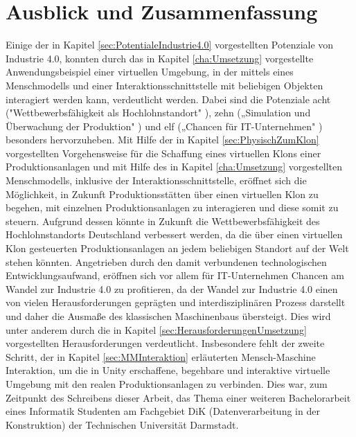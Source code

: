 \chapter{Ausblick und Zusammenfassung}\label{cha:AusblickUndFazit}

Einige der in Kapitel \ref{sec:PotentialeIndustrie4.0} vorgestellten Potenziale von Industrie 4.0, konnten durch das in Kapitel \ref{cha:Umsetzung} vorgestellte Anwendungsbeispiel einer virtuellen Umgebung, in der mittels eines Menschmodells und einer Interaktionsschnittstelle mit beliebigen Objekten interagiert werden kann, verdeutlicht werden. Dabei sind die Potenziale acht ("Wettbewerbsfähigkeit als Hochlohnstandort" \cite[S.20]{12}), zehn („Simulation und Überwachung der Produktion" \cite{6}) und elf („Chancen für IT-Unternehmen" \cite[S.7]{2}) besonders hervorzuheben.
\newline
Mit Hilfe der in Kapitel \ref{sec:PhysischZumKlon} vorgestellten Vorgehensweise für die Schaffung eines virtuellen Klons einer Produktionsanlagen und mit Hilfe des in Kapitel \ref{cha:Umsetzung} vorgestellten Menschmodells, inklusive der Interaktionsschnittstelle, eröffnet sich die Möglichkeit, in Zukunft Produktionsstätten über einen virtuellen Klon zu begehen, mit einzelnen Produktionsanlagen zu interagieren und diese somit zu steuern. Aufgrund dessen könnte in Zukunft die Wettbewerbsfähigkeit des Hochlohnstandorts Deutschland verbessert werden, da die über einen virtuellen Klon gesteuerten Produktionsanlagen an jedem beliebigen Standort auf der Welt stehen könnten.
Angetrieben durch den damit verbundenen technologischen Entwicklungsaufwand, eröffnen sich vor allem für IT-Unternehmen Chancen am Wandel zur Industrie 4.0 zu profitieren, da der Wandel zur Industrie 4.0 einen von vielen Herausforderungen geprägten und interdisziplinären Prozess darstellt und daher die Ausmaße des klassischen Maschinenbaus übersteigt. Dies wird unter anderem durch die in Kapitel \ref{sec:HerausforderungenUmsetzung} vorgestellten Herausforderungen verdeutlicht. Insbesondere fehlt der zweite Schritt, der in Kapitel \ref{sec:MMInteraktion} erläuterten Mensch-Maschine Interaktion, um die in Unity erschaffene, begehbare und interaktive virtuelle Umgebung mit den realen Produktionsanlagen zu verbinden. Dies war, zum Zeitpunkt des Schreibens dieser Arbeit, das Thema einer weiteren Bachelorarbeit eines Informatik Studenten am Fachgebiet DiK (Datenverarbeitung in der Konstruktion) der Technischen Universität Darmstadt.

